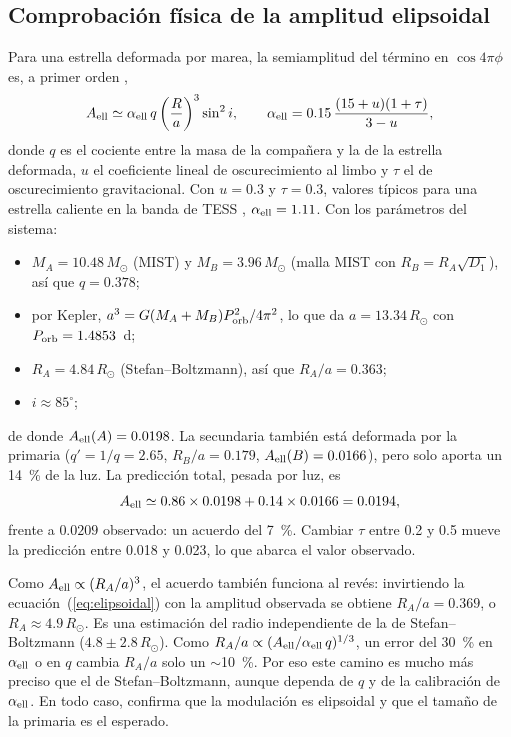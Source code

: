 \documentclass[11pt,a4paper]{article}
\newcommand{\porb}{P_{\rm orb}}
\newcommand{\Rsun}{R_\odot}
\newcommand{\Msun}{M_\odot}
\begin{document}
\subsection{Comprobación física de la amplitud elipsoidal}
\label{sec:chequeo}
Para una estrella deformada por marea, la semiamplitud del término en $\cos4\pi\phi$ es, a primer orden
\citep{Morris1993},
\begin{equation}
A_{\rm ell}\simeq\alpha_{\rm ell}\,q\left(\frac{R}{a}\right)^3\sin^2 i,
\qquad
\alpha_{\rm ell}=0.15\,\frac{(15+u)(1+\tau)}{3-u},
\label{eq:elipsoidal}
\end{equation}
donde $q$ es el cociente entre la masa de la compañera y la de la estrella deformada, $u$ el coeficiente
lineal de oscurecimiento al limbo y $\tau$ el de oscurecimiento gravitacional. Con $u=0.3$ y $\tau=0.3$,
valores típicos para una estrella caliente en la banda de TESS \citep{Claret2017}, $\alpha_{\rm ell}=1.11$.
Con los parámetros del sistema:
\begin{itemize}
\item $M_A=10.48\,\Msun$ (MIST) y $M_B=3.96\,\Msun$ (malla MIST con $R_B=R_A\sqrt{D_1}$), así que $q=0.378$;
\item por Kepler, $a^3=G(M_A+M_B)\porb^2/4\pi^2$, lo que da $a=13.34\,\Rsun$ con $\porb=1.4853$~d;
\item $R_A=4.84\,\Rsun$ (Stefan--Boltzmann), así que $R_A/a=0.363$;
\item $i\approx85^\circ$;
\end{itemize}
de donde $A_{\rm ell}(A)=0.0198$. La secundaria también está deformada por la primaria
($q'=1/q=2.65$, $R_B/a=0.179$, $A_{\rm ell}(B)=0.0166$), pero solo aporta un 14~\% de la luz. La
predicción total, pesada por luz, es
\[
A_{\rm ell}\simeq0.86\times0.0198+0.14\times0.0166=0.0194,
\]
frente a $0.0209$ observado: un acuerdo del 7~\%. Cambiar $\tau$ entre 0.2 y 0.5 mueve la predicción
entre 0.018 y 0.023, lo que abarca el valor observado.

Como $A_{\rm ell}\propto(R_A/a)^3$, el acuerdo también funciona al revés: invirtiendo la
ecuación~(\ref{eq:elipsoidal}) con la amplitud observada se obtiene $R_A/a=0.369$, o
$R_A\approx4.9\,\Rsun$. Es una estimación del radio independiente de la de Stefan--Boltzmann
($4.8\pm2.8\,\Rsun$). Como $R_A/a\propto(A_{\rm ell}/\alpha_{\rm ell}\,q)^{1/3}$, un error del 30~\% en
$\alpha_{\rm ell}$ o en $q$ cambia $R_A/a$ solo un $\sim$10~\%. Por eso este camino es mucho más preciso
que el de Stefan--Boltzmann, aunque dependa de $q$ y de la calibración de $\alpha_{\rm ell}$. En todo
caso, confirma que la modulación es elipsoidal y que el tamaño de la primaria es el esperado.
\end{document}
